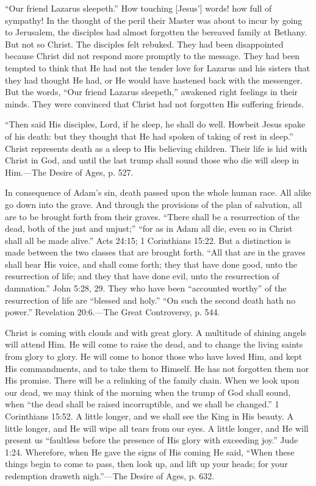 \documentclass[a4paper, 10pt, twoside, headings=small]{scrartcl}
\begin{document}
\begin{multicols}{2}
“Our friend Lazarus sleepeth.” How touching [Jesus’] words! how full of sympathy! In the thought of the peril their Master was about to incur by going to Jerusalem, the disciples had almost forgotten the bereaved family at Bethany. But not so Christ. The disciples felt rebuked. They had been disappointed because Christ did not respond more promptly to the message. They had been tempted to think that He had not the tender love for Lazarus and his sisters that they had thought He had, or He would have hastened back with the messenger. But the words, “Our friend Lazarus sleepeth,” awakened right feelings in their minds. They were convinced that Christ had not forgotten His suffering friends.

“Then said His disciples, Lord, if he sleep, he shall do well. Howbeit Jesus spake of his death: but they thought that He had spoken of taking of rest in sleep.” Christ represents death as a sleep to His believing children. Their life is hid with Christ in God, and until the last trump shall sound those who die will sleep in Him.—The Desire of Ages, p. 527.

In consequence of Adam’s sin, death passed upon the whole human race. All alike go down into the grave. And through the provisions of the plan of salvation, all are to be brought forth from their graves. “There shall be a resurrection of the dead, both of the just and unjust;” “for as in Adam all die, even so in Christ shall all be made alive.” Acts 24:15; 1 Corinthians 15:22. But a distinction is made between the two classes that are brought forth. “All that are in the graves shall hear His voice, and shall come forth; they that have done good, unto the resurrection of life; and they that have done evil, unto the resurrection of damnation.” John 5:28, 29. They who have been “accounted worthy” of the resurrection of life are “blessed and holy.” “On such the second death hath no power.” Revelation 20:6.—The Great Controversy, p. 544.

Christ is coming with clouds and with great glory. A multitude of shining angels will attend Him. He will come to raise the dead, and to change the living saints from glory to glory. He will come to honor those who have loved Him, and kept His commandments, and to take them to Himself. He has not forgotten them nor His promise. There will be a relinking of the family chain. When we look upon our dead, we may think of the morning when the trump of God shall sound, when “the dead shall be raised incorruptible, and we shall be changed.” 1 Corinthians 15:52. A little longer, and we shall see the King in His beauty. A little longer, and He will wipe all tears from our eyes. A little longer, and He will present us “faultless before the presence of His glory with exceeding joy.” Jude 1:24. Wherefore, when He gave the signs of His coming He said, “When these things begin to come to pass, then look up, and lift up your heads; for your redemption draweth nigh.”—The Desire of Ages, p. 632.


\end{multicols}
\end{document}
